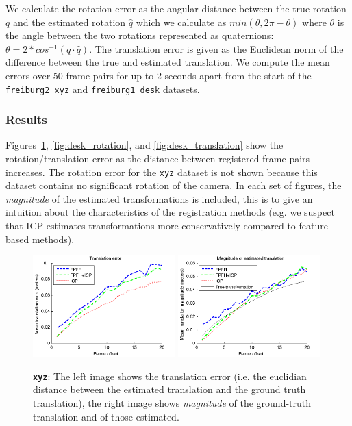 \documentclass[a4paper]{article}
\begin{document}
We calculate the rotation error as the angular distance between the true rotation $q$ and the estimated rotation $\hat q$ which we calculate as $min(\theta, 2\pi - \theta)$ where $\theta$ is the angle between the two rotations represented as quaternions: $\theta = 2 * cos^{-1}(q \cdot \hat q)$. %
The translation error is given as the Euclidean norm of the difference between the true and estimated translation. We compute the mean errors over 50 frame pairs for up to 2 seconds apart from the start of the \texttt{freiburg2\_xyz} and \texttt{freiburg1\_desk} datasets.

\subsubsection{Results}

Figures~\ref{fig:xyz_translation}, \ref{fig:desk_rotation}, and \ref{fig:desk_translation} show the rotation/translation error as the distance between registered frame pairs increases. The rotation error for the \texttt{xyz} dataset is not shown because this dataset contains no significant rotation of the camera. In each set of figures, the \emph{magnitude} of the estimated transformations is included, this is to give an intuition about the characteristics of the registration methods (e.g. we suspect that \ac{ICP} estimates transformations more conservatively compared to feature-based methods). 

\begin{figure}[H]
    \centering
        \includegraphics[width=0.49\textwidth]{ims/xyzTranslationerror.png}
        \includegraphics[width=0.49\textwidth]{ims/xyzMagnitudeofestimatedtranslation.png}
    \caption{\textbf{\texttt{xyz}}: The left image shows the translation error (i.e. the euclidian distance between the estimated translation and the ground truth translation), the right image shows \emph{magnitude} of the ground-truth translation and of those estimated.}
    \label{fig:xyz_translation}
\end{figure}
\end{document}
